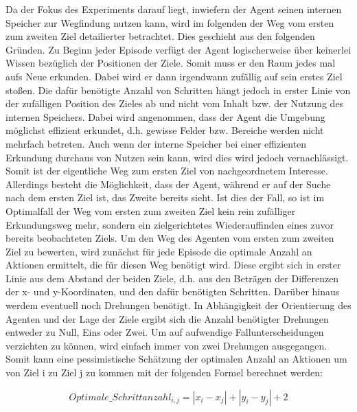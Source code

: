 Da der Fokus des Experiments darauf liegt, inwiefern der Agent seinen internen Speicher zur Wegfindung nutzen kann, wird im folgenden der Weg vom ersten zum zweiten Ziel detailierter betrachtet. Dies geschieht aus den folgenden Gründen. Zu Beginn jeder Episode verfügt der Agent logischerweise über keinerlei Wissen bezüglich der Positionen der Ziele. Somit muss er den Raum jedes mal aufs Neue erkunden. Dabei wird er dann irgendwann zufällig auf sein erstes Ziel stoßen. Die dafür benötigte Anzahl von Schritten hängt jedoch in erster Linie von der zufälligen Position des Zieles ab und nicht vom Inhalt bzw. der Nutzung des internen Speichers. Dabei wird angenommen, dass der Agent die Umgebung möglichst effizient erkundet, d.h. gewisse Felder bzw. Bereiche werden nicht mehrfach betreten. Auch wenn der interne Speicher bei einer effizienten Erkundung durchaus von Nutzen sein kann, wird dies wird jedoch vernachlässigt. Somit ist der eigentliche Weg zum ersten Ziel von nachgeordnetem Interesse. Allerdings besteht die Möglichkeit, dass der Agent, während er auf der Suche nach dem ersten Ziel ist, das Zweite bereits sieht. Ist dies der Fall, so ist im Optimalfall der Weg vom ersten zum zweiten Ziel kein rein zufälliger Erkundungsweg mehr, sondern ein zielgerichtetes Wiederauffinden eines zuvor bereits beobachteten Ziels. Um den Weg des Agenten vom ersten zum zweiten Ziel zu bewerten, wird zunächst für jede Episode die optimale Anzahl an Aktionen ermittelt, die für diesen Weg benötigt wird. Diese ergibt sich in erster Linie aus dem Abstand der beiden Ziele, d.h. aus den Beträgen der Differenzen der x- und y-Koordinaten, und den dafür benötigten Schritten. Darüber hinaus werdem eventuell noch Drehungen benötigt. In Abhängigkeit der Orientierung des Agenten und der Lage der Ziele ergibt sich die Anzahl benötigter Drehungen entweder zu Null, Eins oder Zwei. Um auf aufwendige Fallunterscheidungen verzichten zu können, wird einfach immer von zwei Drehungen ausgegangen. Somit kann eine pessimistische Schätzung der optimalen Anzahl an Aktionen um von Ziel i zu Ziel j zu kommen mit der folgenden Formel berechnet werden:

\begin{equation}
  Optimale\_Schrittanzahl_{i,j} = |x_i - x_j| + |y_i - y_j| + 2
  \label{opt_steps_i_to_j}
\end{equation}

